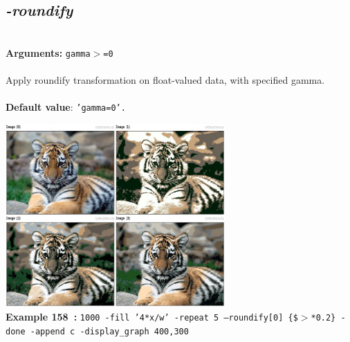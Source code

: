 \documentclass[a4paper,11pt,twoside]{book}
\begin{document}
\subsection{\emph{-roundify} }\vspace*{-0.5em}
~\\\textbf{Arguments: } 
{\small \texttt{gamma$>$=0}}\\~\\
Apply roundify transformation on float-valued data, with specified gamma.
~\\~\\\textbf{Default value}: {\small \texttt{'gamma=0'.}}
\begin{center}\includegraphics[keepaspectratio=true,height=7cm,width=\textwidth]{img/gmic_def158.jpg}\\
{\footnotesize \textbf{Example 158~:} \texttt{1000 -fill '4*x/w' -repeat 5 --roundify[0] \{\$$>$*0.2\} -done -append c -display\_graph 400,300}}
\end{center}
\end{document}
